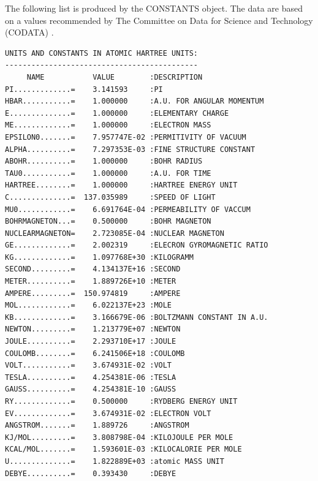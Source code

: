 \documentclass[final,12pt,makeidx,DIV=calc]{article}
\begin{document}
{{{{{{The following list is produced by the CONSTANTS object.  The data are
based on a values recommended by The Committee on Data for Science and
Technology (CODATA) \cite{mohr00_rmp72_351}.
\begin{verbatim}
UNITS AND CONSTANTS IN ATOMIC HARTREE UNITS:
--------------------------------------------
     NAME           VALUE        :DESCRIPTION
PI.............=    3.141593     :PI
HBAR...........=    1.000000     :A.U. FOR ANGULAR MOMENTUM
E..............=    1.000000     :ELEMENTARY CHARGE
ME.............=    1.000000     :ELECTRON MASS
EPSILON0.......=    7.957747E-02 :PERMITIVITY OF VACUUM
ALPHA..........=    7.297353E-03 :FINE STRUCTURE CONSTANT
ABOHR..........=    1.000000     :BOHR RADIUS
TAU0...........=    1.000000     :A.U. FOR TIME
HARTREE........=    1.000000     :HARTREE ENERGY UNIT
C..............=  137.035989     :SPEED OF LIGHT
MU0............=    6.691764E-04 :PERMEABILITY OF VACCUM
BOHRMAGNETON...=    0.500000     :BOHR MAGNETON
NUCLEARMAGNETON=    2.723085E-04 :NUCLEAR MAGNETON
GE.............=    2.002319     :ELECRON GYROMAGNETIC RATIO
KG.............=    1.097768E+30 :KILOGRAMM      
SECOND.........=    4.134137E+16 :SECOND     
METER..........=    1.889726E+10 :METER
AMPERE.........=  150.974819     :AMPERE           
MOL............=    6.022137E+23 :MOLE
KB.............=    3.166679E-06 :BOLTZMANN CONSTANT IN A.U.
NEWTON.........=    1.213779E+07 :NEWTON
JOULE..........=    2.293710E+17 :JOULE
COULOMB........=    6.241506E+18 :COULOMB
VOLT...........=    3.674931E-02 :VOLT
TESLA..........=    4.254381E-06 :TESLA
GAUSS..........=    4.254381E-10 :GAUSS
RY.............=    0.500000     :RYDBERG ENERGY UNIT
EV.............=    3.674931E-02 :ELECTRON VOLT
ANGSTROM.......=    1.889726     :ANGSTROM
KJ/MOL.........=    3.808798E-04 :KILOJOULE PER MOLE
KCAL/MOL.......=    1.593601E-03 :KILOCALORIE PER MOLE
U..............=    1.822889E+03 :atomic MASS UNIT 
DEBYE..........=    0.393430     :DEBYE



\end{verbatim}}}}}}}
\end{document}
